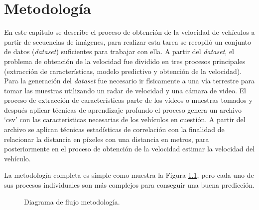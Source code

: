 \chapter{Metodología}
\label{cap:metodologia}

En este capítulo se describe el proceso de obtención de la velocidad de vehículos a partir de secuencias de imágenes, para realizar esta tarea se recopiló un conjunto de datos (\textit{dataset}) suficientes para trabajar con ella.  A partir del \textit{dataset}, el problema de obtención de la velocidad fue dividido en tres procesos principales (extracción de características, modelo predictivo y obtención de la velocidad). Para la generación del \textit{dataset} fue necesario ir físicamente a una vía terrestre para tomar las muestras utilizando un radar de velocidad y una cámara de video. El proceso de extracción de características parte de los vídeos o muestras tomados y después aplicar técnicas de aprendizaje profundo el proceso genera un archivo \enquote*{csv} con las características necesarias de los vehículos en cuestión. A partir del archivo se aplican técnicas estadísticas de correlación con la finalidad de relacionar la distancia en píxeles con una distancia en metros, para posteriormente en el proceso de obtención de la velocidad estimar la velocidad del vehículo. 


La metodología completa es simple como muestra la Figura \ref{fig:MetodologiaDF}, pero cada uno de sus procesos individuales son más complejos para conseguir una buena predicción.


\begin{figure}[H]

    \centering
    \caption{Diagrama de flujo metodología.}
    \label{fig:MetodologiaDF}

\end{figure}






